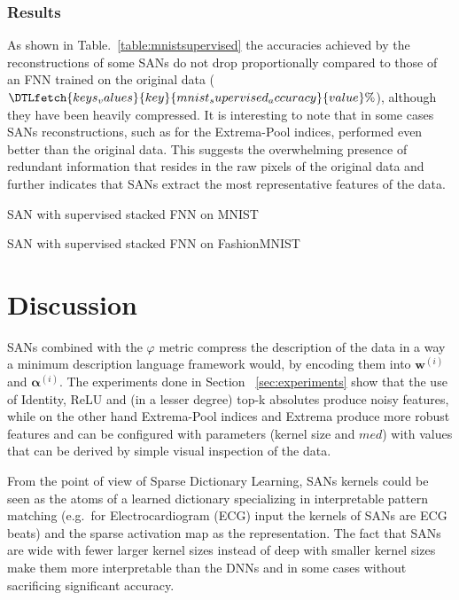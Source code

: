 \documentclass[journal]{IEEEtran}
\begin{document}
\subsubsection{Results}
As shown in Table.~\ref{table:mnistsupervised} the accuracies achieved by the reconstructions of some SANs do not drop proportionally compared to those of an FNN trained on the original data ($\DTLfetch{keys_values}{key}{mnist_supervised_accuracy}{value}\%$), although they have been heavily compressed.
It is interesting to note that in some cases SANs reconstructions, such as for the Extrema-Pool indices, performed even better than the original data.
This suggests the overwhelming presence of redundant information that resides in the raw pixels of the original data and further indicates that SANs extract the most representative features of the data.

\begin{table*}[!t]
	\centering
	\caption{SAN with supervised stacked FNN on MNIST}
	\label{table:mnistsupervised}
	\setlength\tabcolsep{3.3pt}
	
\end{table*}

\begin{table*}[!t]
	\centering
	\caption{SAN with supervised stacked FNN on FashionMNIST}
	\label{table:fashionmnistsupervised}
	\setlength\tabcolsep{3.5pt}
	
\end{table*}

\section{Discussion}
\label{sec:discussion}
SANs combined with the $\varphi$ metric compress the description of the data in a way a minimum description language framework would, by encoding them into $\bm{w}^{(i)}$ and $\bm{\alpha}^{(i)}$.
The experiments done in Section ~\ref{sec:experiments} show that the use of Identity, ReLU and (in a lesser degree) top-k absolutes produce noisy features, while on the other hand Extrema-Pool indices and Extrema produce more robust features and can be configured with parameters (kernel size and $med$) with values that can be derived by simple visual inspection of the data.

From the point of view of Sparse Dictionary Learning, SANs kernels could be seen as the atoms of a learned dictionary specializing in interpretable pattern matching (e.g.\ for Electrocardiogram (ECG) input the kernels of SANs are ECG beats) and the sparse activation map as the representation.
The fact that SANs are wide with fewer larger kernel sizes instead of deep with smaller kernel sizes make them more interpretable than the DNNs and in some cases without sacrificing significant accuracy.
\end{document}
